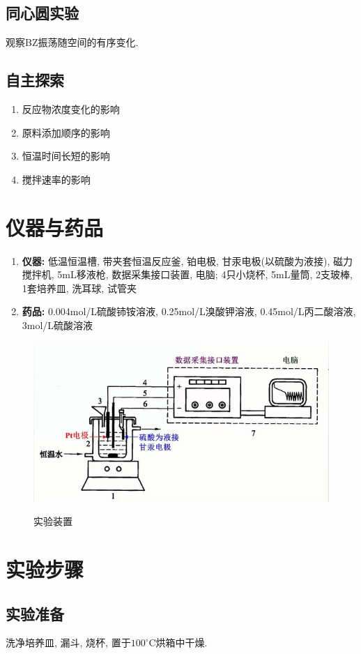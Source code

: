 \documentclass[a4paper]{article}
\begin{document}
\subsection{同心圆实验}
观察BZ振荡随空间的有序变化. 
\subsection{自主探索}
\begin{enumerate}
	\item 反应物浓度变化的影响
	\item 原料添加顺序的影响
	\item 恒温时间长短的影响
	\item 搅拌速率的影响
\end{enumerate}
\section{仪器与药品}
\begin{enumerate}
    \item \textbf{仪器:} 低温恒温槽, 带夹套恒温反应釜, 铂电极, 甘汞电极(以硫酸为液接),
		磁力搅拌机, 5mL移液枪, 数据采集接口装置, 电脑; 4只小烧杯, 5mL量筒, 2支玻棒, 1套培养皿, 洗耳球, 试管夹
    \item \textbf{药品:} 0.004mol/L硫酸铈铵溶液, 0.25mol/L溴酸钾溶液, 0.45mol/L丙二酸溶液, 3mol/L硫酸溶液
\end{enumerate}
\begin{figure}[!h]
	\centering
	\includegraphics[width=0.30\paperwidth]{fig/config.png}\\
	\caption{实验装置}\label{wf}
\end{figure}
\section{实验步骤}
\subsection{实验准备}
洗净培养皿, 漏斗, 烧杯, 置于$100^\circ$C烘箱中干燥.
\end{document}
